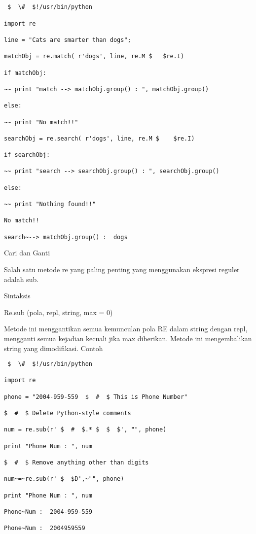 \begin {enumerate}
\begin {enumerate}
\begin{verbatim}


 $  \#  $!/usr/bin/python

import re

line = "Cats are smarter than dogs";

matchObj = re.match( r'dogs', line, re.M $   $re.I)

if matchObj:

~~ print "match --> matchObj.group() : ", matchObj.group()

else:

~~ print "No match!!"

searchObj = re.search( r'dogs', line, re.M $    $re.I)

if searchObj:

~~ print "search --> searchObj.group() : ", searchObj.group()

else:

~~ print "Nothing found!!"

No match!!

search~--> matchObj.group() :  dogs
\end{verbatim}

Cari dan Ganti

Salah satu metode re yang paling penting yang menggunakan ekspresi reguler adalah sub.

Sintaksis

Re.sub (pola, repl, string, max = 0)

Metode ini menggantikan semua kemunculan pola RE dalam string dengan repl, mengganti semua kejadian kecuali jika max diberikan. Metode ini mengembalikan string yang dimodifikasi.
Contoh
\begin{verbatim}
 $  \#  $!/usr/bin/python

import re

phone = "2004-959-559  $  #  $ This is Phone Number"

$  #  $ Delete Python-style comments

num = re.sub(r' $  #  $.* $  $  $', "", phone)

print "Phone Num : ", num

$  #  $ Remove anything other than digits

num~=~re.sub(r' $  $D',~"", phone)

print "Phone Num : ", num

Phone~Num :  2004-959-559

Phone~Num :  2004959559
\end{verbatim}


\end{enumerate}
\end{enumerate}
